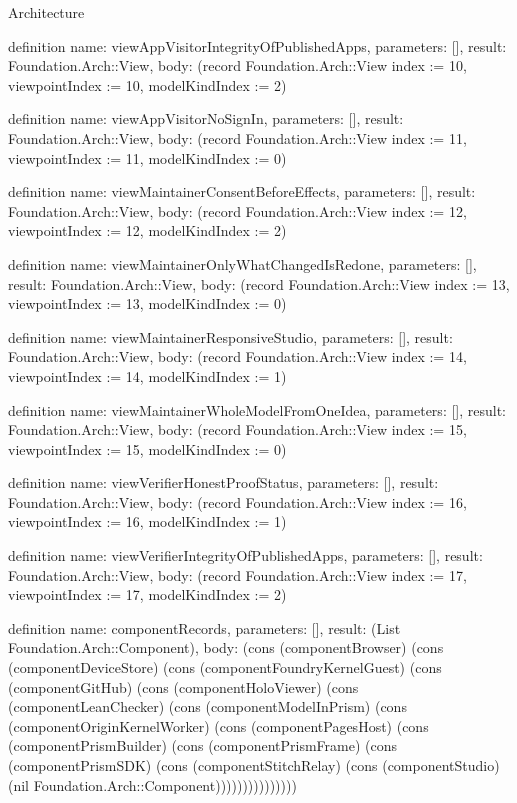 \begin{lexlean}{Architecture}
\begin{semanticmodule}
definition{
  name: viewAppVisitorIntegrityOfPublishedApps,
  parameters: [],
  result: Foundation.Arch::View,
  body: (record Foundation.Arch::View {index := 10, viewpointIndex := 10, modelKindIndex := 2})
}

definition{
  name: viewAppVisitorNoSignIn,
  parameters: [],
  result: Foundation.Arch::View,
  body: (record Foundation.Arch::View {index := 11, viewpointIndex := 11, modelKindIndex := 0})
}

definition{
  name: viewMaintainerConsentBeforeEffects,
  parameters: [],
  result: Foundation.Arch::View,
  body: (record Foundation.Arch::View {index := 12, viewpointIndex := 12, modelKindIndex := 2})
}

definition{
  name: viewMaintainerOnlyWhatChangedIsRedone,
  parameters: [],
  result: Foundation.Arch::View,
  body: (record Foundation.Arch::View {index := 13, viewpointIndex := 13, modelKindIndex := 0})
}

definition{
  name: viewMaintainerResponsiveStudio,
  parameters: [],
  result: Foundation.Arch::View,
  body: (record Foundation.Arch::View {index := 14, viewpointIndex := 14, modelKindIndex := 1})
}

definition{
  name: viewMaintainerWholeModelFromOneIdea,
  parameters: [],
  result: Foundation.Arch::View,
  body: (record Foundation.Arch::View {index := 15, viewpointIndex := 15, modelKindIndex := 0})
}

definition{
  name: viewVerifierHonestProofStatus,
  parameters: [],
  result: Foundation.Arch::View,
  body: (record Foundation.Arch::View {index := 16, viewpointIndex := 16, modelKindIndex := 1})
}

definition{
  name: viewVerifierIntegrityOfPublishedApps,
  parameters: [],
  result: Foundation.Arch::View,
  body: (record Foundation.Arch::View {index := 17, viewpointIndex := 17, modelKindIndex := 2})
}

definition{
  name: componentRecords,
  parameters: [],
  result: (List Foundation.Arch::Component),
  body: (cons (componentBrowser) (cons (componentDeviceStore) (cons (componentFoundryKernelGuest) (cons (componentGitHub) (cons (componentHoloViewer) (cons (componentLeanChecker) (cons (componentModelInPrism) (cons (componentOriginKernelWorker) (cons (componentPagesHost) (cons (componentPrismBuilder) (cons (componentPrismFrame) (cons (componentPrismSDK) (cons (componentStitchRelay) (cons (componentStudio) (nil Foundation.Arch::Component)))))))))))))))
}


\end{semanticmodule}
\end{lexlean}
